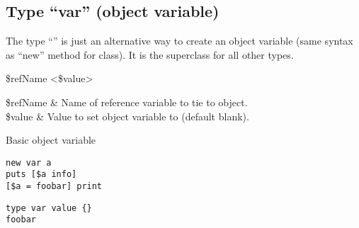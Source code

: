 \documentclass{article}
\begin{document}
\subsection{Type ``var'' (object variable)}
The type ``'' is just an alternative way to create an object variable (same syntax as ``new'' method for  class).
It is the superclass for all other types.
\begin{syntax}
 \$refName <\$value>
\end{syntax}
\begin{args}
\$refName & Name of reference variable to tie to object. \\
\$value & Value to set object variable to (default blank).
\end{args}
\begin{example}{Basic object variable}
\begin{lstlisting}
new var a
puts [$a info]
[$a = foobar] print
\end{lstlisting}
\tcblower
\begin{lstlisting}
type var value {}
foobar
\end{lstlisting}
\end{example}

\clearpage
\end{document}
